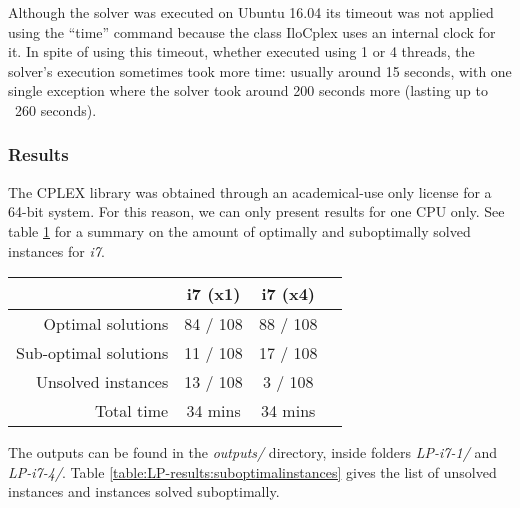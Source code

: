 Although the solver was executed on Ubuntu 16.04 its timeout was not applied using
the ``time'' command because the class IloCplex uses an internal clock for it. In
spite of using this timeout, whether executed using 1 or 4 threads, the solver's
execution sometimes took more time: usually around 15 seconds, with one single
exception where the solver took around 200 seconds more (lasting up to ~260 seconds).

\subsubsection{Results}
\label{sec:benchmarking:linear-programming:results}

The CPLEX library was obtained through an academical-use only license for a 64-bit system.
For this reason, we can only present results for one CPU only. See table \ref{table:LP-results}
for a summary on the amount of optimally and suboptimally solved instances for \textit{i7}.

\begin{table}[H]
\centering
	\begin{tabular}{rccc}
								& i7 (x1)	& i7 (x4) \\
		\midrule
		Optimal solutions		& 84 / 108	& 88 / 108 \\
		Sub-optimal solutions	& 11 / 108	& 17 / 108 \\
		Unsolved instances		& 13 / 108	& 3 / 108 \\
		Total time				& 34 mins	& 34 mins \\
	\end{tabular}
	\label{table:LP-results}
\end{table}

The outputs can be found in the \textit{outputs/} directory, inside folders
\textit{LP-i7-1/} and \textit{LP-i7-4/}. Table \ref{table:LP-results:suboptimalinstances}
gives the list of unsolved instances and instances solved suboptimally.

